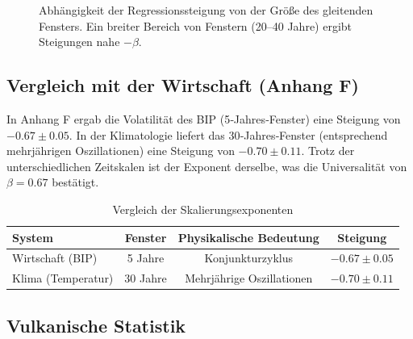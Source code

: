 \documentclass[12pt,a4paper]{article}
\newcommand{\be}{\beta}
\begin{document}
	\begin{figure}[htbp]
		\centering
		\caption{Abhängigkeit der Regressionssteigung von der Größe des gleitenden Fensters. Ein breiter Bereich von Fenstern (20–40 Jahre) ergibt Steigungen nahe \(-\be\).}
		\label{fig:slope_vs_window}
	\end{figure}
	
	\subsection{Vergleich mit der Wirtschaft (Anhang F)}
	
	In Anhang F ergab die Volatilität des BIP (5‑Jahres‑Fenster) eine Steigung von \(-0.67 \pm 0.05\). In der Klimatologie liefert das 30‑Jahres‑Fenster (entsprechend mehrjährigen Oszillationen) eine Steigung von \(-0.70 \pm 0.11\). Trotz der unterschiedlichen Zeitskalen ist der Exponent derselbe, was die Universalität von \(\be = 0.67\) bestätigt.
	
	\begin{table}[htbp]
		\centering
		\caption{Vergleich der Skalierungsexponenten}
		\label{tab:compare}
		\begin{tabular}{@{}lccc@{}}
			\toprule
			System & Fenster & Physikalische Bedeutung & Steigung \\
			\midrule
			Wirtschaft (BIP) & 5 Jahre & Konjunkturzyklus & \(-0.67 \pm 0.05\) \\
			Klima (Temperatur) & 30 Jahre & Mehrjährige Oszillationen & \(-0.70 \pm 0.11\) \\
			\bottomrule
		\end{tabular}
	\end{table}
	
	\subsection{Vulkanische Statistik}
	
\end{document}
